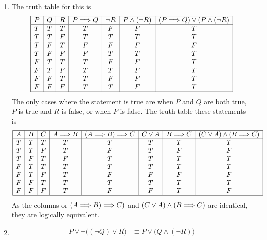 \documentclass[../MATH135.tex]{subfiles}
\begin{document}
\begin{enumerate}
\begin{tasks}
				\end{tasks}
			\item
				\begin{tasks}
					\task
						The truth table for this is
							\[\begin{array}{*{7}{|c}|}\hline
								P & Q & R & P \simp Q & \lnot R & P \land (\lnot R) & (P \simp Q) \lor (P \land (\lnot R) \\\hline
								T & T & T & T & F & F & T \\
								T & T & F & T & T & T & T \\
								T & F & T & F & F & F & F \\
								T & F & F & F & T & T & T \\
								F & T & T & T & F & F & T \\
								F & T & F & T & T & F & T \\
								F & F & T & T & F & F & T \\
								F & F & F & T & T & F & T \\\hline
							\end{array}\]
						The only cases where the statement is true are when \(P\) and \(Q\) are both true, \(P\) is true and \(R\) is false, or when \(P\) is false.
					\task
						The truth table these statements is 
							\[\begin{array}{*{8}{|c}|}\hline
								A & B & C & A \simp B & (A \simp B) \simp C & C \lor A & B \simp C & (C \lor A) \land (B \simp C) \\\hline
								T & T & T & T & T & T & T & T \\
								T & T & F & T & F & T & F & F \\
								T & F & T & F & T & T & T & T \\
								F & T & T & T & T & T & T & T \\
								F & T & F & T & F & F & F & F \\
								F & F & T & T & T & T & T & T \\
								F & F & F & T & F & F & T & F \\\hline
							\end{array}\]
						As the columns or \((A \Longrightarrow B) \Longrightarrow C)\) and \((C \lor A) \land (B \Longrightarrow C)\) are identical, they are logically equivalent.
				\end{tasks}
			\item
				\begin{align*}
					P \lor \lnot\bigl((\lnot Q) \lor R\bigr) &\equiv P \lor \bigl(Q \land (\lnot R)\bigr) \tag{DeM/def. of \(\lnot\)} \\

\end{align*}
\end{enumerate}
\end{document}
